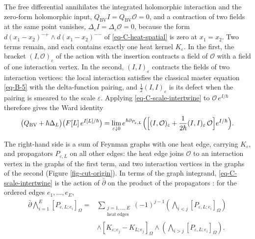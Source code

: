 \documentclass[11pt]{article}
\numberwithin{equation}{section}
\numberwithin{figure}{section}
\numberwithin{table}{section}
\begin{document}
The free differential annihilates the integrated holomorphic interaction and the zero-form holomorphic input, $Q_{\mathrm{BV}}I=Q_{\mathrm{BV}}\mathcal O=0$, and a contraction of two fields at the same point vanishes, $\Delta_\varepsilon I=\Delta_\varepsilon\mathcal O=0$, because the form $d(x_1-x_2)^{-\dot+}\wedge d(x_1-x_2)^{-\dot-}$ of \eqref{eq-C-heat-spatial} is zero at $x_1=x_2$. Two terms remain, and each contains exactly one heat kernel $K_\varepsilon$. In the first, the bracket $(I,\mathcal O)_\varepsilon$ of the action with the insertion contracts a field of $\mathcal O$ with a field of one interaction vertex. In the second, $(I,I)_\varepsilon$ contracts the fields of two interaction vertices: the local interaction satisfies the classical master equation \eqref{eq-B-5} with the delta-function pairing, and $\frac12(I,I)_\varepsilon$ is its defect when the pairing is smeared to the scale $\varepsilon$. Applying \eqref{eq-C-scale-intertwine} to $\mathcal O\,e^{I/\hbar}$ therefore gives the Ward identity
\begin{equation}\label{eq-C-Ward}
\bigl(Q_{\mathrm{BV}}+\hbar\Delta_L\bigr)\bigl(F[L]\,e^{I[L]/\hbar}\bigr)
=\lim_{\varepsilon\downarrow0}e^{\hbar\partial_{P_{\varepsilon,L}}}
\Bigl(\Bigl[(I,\mathcal O)_\varepsilon+\frac1{2\hbar}(I,I)_\varepsilon\,\mathcal O\Bigr]e^{I/\hbar}\Bigr).
\end{equation}

The right-hand side is a sum of Feynman graphs with one heat edge, carrying $K_\varepsilon$, and propagators $P_{\varepsilon,L}$ on all other edges: the heat edge joins $\mathcal O$ to an interaction vertex in the graphs of the first term, and two interaction vertices in the graphs of the second (Figure \ref{fig-cut-origin}). In terms of the graph integrand, \eqref{eq-C-scale-intertwine} is the action of $\bar\partial$ on the product of the propagators \cite[\S2.3]{BK}: for the ordered edges $e_1,\ldots,e_E$,
\begin{equation}\label{eq-C-heat-edge-cut}
\begin{aligned}
\bar\partial\bigwedge_{i=1}^{E}[P_{\varepsilon,L;e_i}]_\Omega
={}&\sum_{\substack{j=1,\ldots,E\\\mathrm{heat\ edges}}}(-1)^{j-1}
\left(\bigwedge_{i<j}[P_{\varepsilon,L;e_i}]_\Omega\right)\\
&\wedge[K_{\varepsilon;e_j}-K_{L;e_j}]_\Omega
\wedge\left(\bigwedge_{i>j}[P_{\varepsilon,L;e_i}]_\Omega\right).
\end{aligned}
\end{equation}
\end{document}
